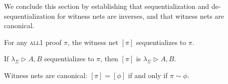 \documentclass[UKenglish]{lipics-v2019}
\newcommand\all{\textsc{all}}
\newcommand\+{+}
\renewcommand\*{\times}
\newcommand\prf[3]{#1\vdash\!#2,#3}
\newcommand\net[3]{#1\triangleright #2,#3}
\newcommand\deseq[4][\sigma]{[#2]_{#1}^{#3,#4}}
\newcommand\link[3][\sigma]{(#2,#3)_{#1}}
\newcommand\scoal{\rightarrow} %
\begin{document}
We conclude this section by establishing that sequentialization and de-sequentialization for witness nets are inverses, and that witness nets are canonical.

\begin{theorem}
\label{thm:proof->net->proof}
For any \all1 proof $\pi$, the witness net $[\pi]$ sequentializes to $\pi$. 
\end{theorem}


\begin{theorem}
\label{thm:net->proof->net}
If $\net{\lambda_\Sigma}AB$ sequentializes to $\pi$, then $[\pi]$ is $\net{\lambda_\Sigma}AB$. 
\end{theorem}


\begin{theorem}
\label{thm:canonical}
Witness nets are canonical: $[\pi]=[\phi]$ if and only if $\pi\sim\phi$.
\end{theorem}

\end{document}
